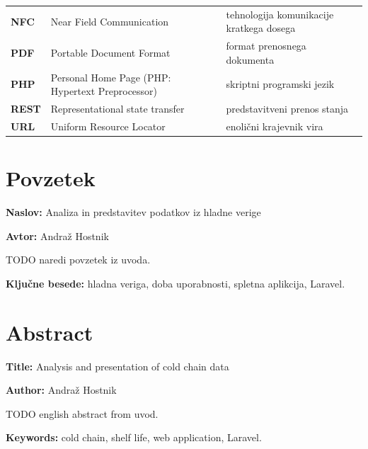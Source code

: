\documentclass[a4paper, 12pt]{book}
\newcommand{\ttitle}{Analiza in predstavitev podatkov iz hladne verige}
\newcommand{\ttitleEn}{Analysis and presentation of cold chain data}
\newcommand{\tauthor}{Andraž Hostnik}
\newcommand{\tkeywords}{hladna veriga, doba uporabnosti, spletna aplikcija, Laravel}
\newcommand{\tkeywordsEn}{cold chain, shelf life, web application, Laravel}
\newcommand{\clearemptydoublepage}{\newpage{\pagestyle{empty}\cleardoublepage}}
\begin{document}
\begin{tabular}{p{}|p{}|p{}}
  {\bf NFC} & Near Field Communication & tehnologija komunikacije kratkega dosega \\
  {\bf PDF} & Portable Document Format & format prenosnega dokumenta \\
  {\bf PHP} & Personal Home Page (PHP: Hypertext Preprocessor) & skriptni programski jezik \\
  {\bf REST} & Representational state transfer & predstavitveni prenos stanja \\
  {\bf URL} & Uniform Resource Locator & enolični krajevnik vira \\
\end{tabular}


\clearemptydoublepage

\chapter*{Povzetek}

\noindent\textbf{Naslov:} \ttitle
\bigskip

\noindent\textbf{Avtor:} \tauthor
\bigskip

\noindent TODO naredi povzetek iz uvoda.

\bigskip

\noindent\textbf{Ključne besede:} \tkeywords.
\clearemptydoublepage

\chapter*{Abstract}

\noindent\textbf{Title:} \ttitleEn
\bigskip

\noindent\textbf{Author:} \tauthor
\bigskip

\noindent TODO english abstract from uvod.
\bigskip

\noindent\textbf{Keywords:} \tkeywordsEn.
\clearemptydoublepage
\end{document}
